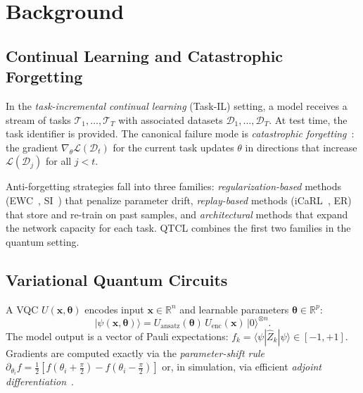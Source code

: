 \documentclass[a4paper,nopdfoutputerror]{quantumarticle}
\begin{document}
\section{Background}
\label{sec:background}

\subsection{Continual Learning and Catastrophic Forgetting}

In the \emph{task-incremental continual learning} (Task-IL) setting, a model
receives a stream of tasks $\mathcal{T}_1,\ldots,\mathcal{T}_T$ with
associated datasets $\mathcal{D}_1,\ldots,\mathcal{D}_T$.
At test time, the task identifier is provided.
The canonical failure mode is \emph{catastrophic forgetting}~\cite{mccloskey1989}:
the gradient $\nabla_\theta \mathcal{L}(\mathcal{D}_t)$ for the current task
updates $\theta$ in directions that increase $\mathcal{L}(\mathcal{D}_j)$
for all $j < t$.

Anti-forgetting strategies fall into three families:
\emph{regularization-based} methods (EWC~\cite{kirkpatrick2017overcoming},
SI~\cite{zenke2017continual}) that penalize parameter drift,
\emph{replay-based} methods (iCaRL~\cite{Rebuffi2017}, ER) that store and
re-train on past samples, and \emph{architectural} methods that expand the
network capacity for each task.
QTCL combines the first two families in the quantum setting.

\subsection{Variational Quantum Circuits}

A VQC $U(\mathbf{x}, \boldsymbol\theta)$ encodes input $\mathbf{x}\in\mathbb{R}^n$
and learnable parameters $\boldsymbol\theta\in\mathbb{R}^p$:
\begin{equation}
  |\psi(\mathbf{x},\boldsymbol\theta)\rangle =
  U_\mathrm{ansatz}(\boldsymbol\theta)\,U_\mathrm{enc}(\mathbf{x})\,|0\rangle^{\otimes n}.
\end{equation}
The model output is a vector of Pauli expectations:
$f_k = \langle\psi|\hat{Z}_k|\psi\rangle \in [-1,+1]$.
Gradients are computed exactly via the \emph{parameter-shift rule}
$\partial_{\theta_i} f = \tfrac{1}{2}[f(\theta_i+\tfrac{\pi}{2}) - f(\theta_i-\tfrac{\pi}{2})]$
or, in simulation, via efficient \emph{adjoint differentiation}~\cite{jones2020}.
\end{document}
